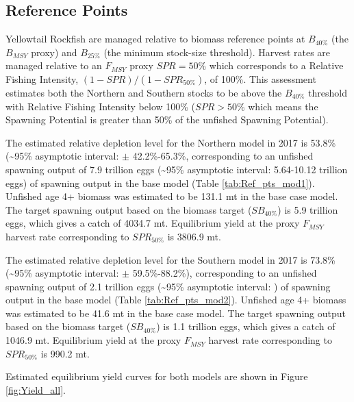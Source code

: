 \documentclass[12pt,]{article}
\begin{document}
\subsection*{Reference Points}\label{reference-points}

Yellowtail Rockfish are managed relative to biomass reference points at
\(B_{40\%}\) (the \(B_{MSY}\) proxy) and \(B_{25\%}\) (the minimum
stock-size threshold). Harvest rates are managed relative to an
\(F_{MSY}\) proxy \(SPR = 50\%\) which corresponds to a Relative Fishing
Intensity, \((1 - {SPR})/(1 - {SPR}_{50\%})\), of 100\%. This assessment
estimates both the Northern and Southern stocks to be above the
\(B_{40\%}\) threshold with Relative Fishing Intensity below 100\%
(\({SPR} > 50\%\) which means the Spawning Potential is greater than
50\% of the unfished Spawning Potential).

The estimated relative depletion level for the Northern model in 2017 is
53.8\% (\textasciitilde{}95\% asymptotic interval: \(\pm\)
42.2\%-65.3\%, corresponding to an unfished spawning output of 7.9
trillion eggs (\textasciitilde{}95\% asymptotic interval: 5.64-10.12
trillion eggs) of spawning output in the base model (Table
\ref{tab:Ref_pts_mod1}). Unfished age 4+ biomass was estimated to be
131.1 mt in the base case model. The target spawning output based on the
biomass target (\(SB_{40\%}\)) is 5.9 trillion eggs, which gives a catch
of 4034.7 mt. Equilibrium yield at the proxy \(F_{MSY}\) harvest rate
corresponding to \(SPR_{50\%}\) is 3806.9 mt.

The estimated relative depletion level for the Southern model in 2017 is
73.8\% (\textasciitilde{}95\% asymptotic interval: \(\pm\)
59.5\%-88.2\%), corresponding to an unfished spawning output of 2.1
trillion eggs (\textasciitilde{}95\% asymptotic interval: ) of spawning
output in the base model (Table \ref{tab:Ref_pts_mod2}). Unfished age 4+
biomass was estimated to be 41.6 mt in the base case model. The target
spawning output based on the biomass target (\(SB_{40\%}\)) is 1.1
trillion eggs, which gives a catch of 1046.9 mt. Equilibrium yield at
the proxy \(F_{MSY}\) harvest rate corresponding to \(SPR_{50\%}\) is
990.2 mt.

Estimated equilibrium yield curves for both models are shown in Figure
\ref{fig:Yield_all}.

\FloatBarrier
\end{document}

